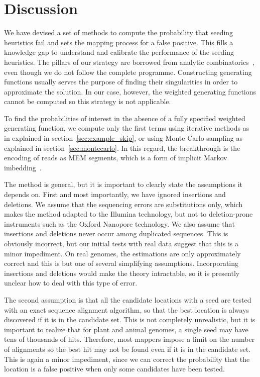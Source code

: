\documentclass{article}
\begin{document}
\section{Discussion}

We have devised a set of methods to compute the probability that seeding
heuristics fail and sets the mapping process for a false positive. This
fills a knowledge gap to understand and calibrate the performance of the
seeding heuristics. The pillars of our strategy are borrowed from analytic
combinatorics~\cite{flajolet2009analytic, sedgewick2013introduction}, even
though we do not follow the complete programme. Constructing generating
functions usually serves the purpose of finding their singularities in
order to approximate the solution. In our case, however, the weighted
generating functions cannot be computed so this strategy is not
applicable.

To find the probabilities of interest in the absence of a fully specified
weighted generating function, we compute only the first terms using
iterative methods as in explained in section~\ref{sec:example_skip}, 
or using Monte Carlo sampling as explained in
section~\ref{sec:montecarlo}. In this regard, the breakthrough is the
encoding of reads as MEM segments, which is a form of implicit Markov
imbedding~\cite{fu1994distribution}.

The method is general, but it is important to clearly state the
assumptions it depends on. First and most importantly, we have ignored
insertions and deletions. We assume that the sequencing errors are
substitutions only, which makes the method adapted to the Illumina
technology, but not to deletion-prone instruments such as the Oxford
Nanopore technology. We also assume that insertions and deletions never
occur among duplicated sequences. This is obviously incorrect, but our
initial tests with real data suggest that this is a minor impediment. On
real genomes, the estimations are only approximately correct and this is
but one of several simplifying assumptions. Incorporating insertions and
deletions would make the theory intractable, so it is presently unclear
how to deal with this type of error.

The second assumption is that all the candidate locations with a seed are
tested with an exact sequence alignment algorithm, so that the best
location is always discovered if it is in the candidate set. This is not
completely unrealistic, but it is important to realize that for plant and
animal genomes, a single seed may have tens of thousands of hits.
Therefore, most mappers impose a limit on the number of alignments so the
best hit may not be found even if it is in the candidate set. This is
again a minor impediment, since we can correct the probability that the
location is a false positive when only some candidates have been tested.
\end{document}
